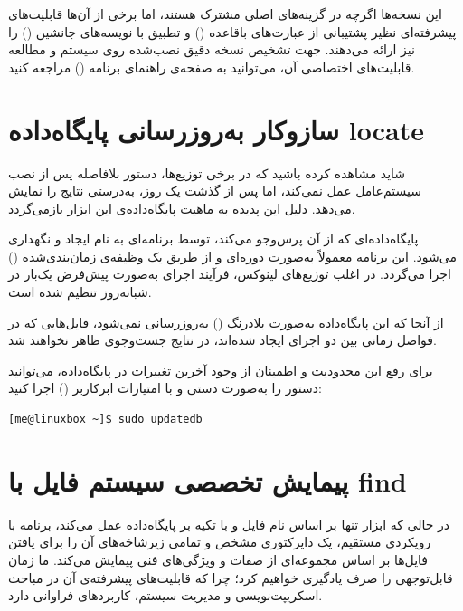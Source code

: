 این نسخه‌ها اگرچه در گزینه‌های اصلی مشترک هستند، اما برخی از آن‌ها قابلیت‌های پیشرفته‌ای نظیر پشتیبانی از عبارت‌های باقاعده () و تطبیق با نویسه‌های جانشین () را نیز ارائه می‌دهند. جهت تشخیص نسخه دقیق نصب‌شده روی سیستم و مطالعه قابلیت‌های اختصاصی آن، می‌توانید به صفحه‌ی راهنمای برنامه () مراجعه کنید.

\section{سازوکار به‌روزرسانی پایگاه‌داده locate}

شاید مشاهده کرده باشید که در برخی توزیع‌ها، دستور  بلافاصله پس از نصب سیستم‌عامل عمل نمی‌کند، اما پس از گذشت یک روز، به‌درستی نتایج را نمایش می‌دهد. دلیل این پدیده به ماهیت پایگاه‌داده‌ی این ابزار بازمی‌گردد.

پایگاه‌داده‌ای که  از آن پرس‌وجو می‌کند، توسط برنامه‌ای به نام  ایجاد و نگهداری می‌شود. این برنامه معمولاً به‌صورت دوره‌ای و از طریق یک وظیفه‌ی زمان‌بندی‌شده () اجرا می‌گردد. در اغلب توزیع‌های لینوکس، فرآیند اجرای  به‌صورت پیش‌فرض یک‌بار در شبانه‌روز تنظیم شده است.

از آنجا که این پایگاه‌داده به‌صورت بلادرنگ () به‌روزرسانی نمی‌شود، فایل‌هایی که در فواصل زمانی بین دو اجرای  ایجاد شده‌اند، در نتایج جست‌وجوی  ظاهر نخواهند شد.

برای رفع این محدودیت و اطمینان از وجود آخرین تغییرات در پایگاه‌داده، می‌توانید دستور  را به‌صورت دستی و با امتیازات ابرکاربر () اجرا کنید:

\begin{latin}
\begin{lstlisting}
[me@linuxbox ~]$ sudo updatedb
\end{lstlisting}
\end{latin}

\section{پیمایش تخصصی سیستم فایل با find}

در حالی که ابزار  تنها بر اساس نام فایل و با تکیه بر پایگاه‌داده عمل می‌کند، برنامه  با رویکردی مستقیم، یک دایرکتوری مشخص و تمامی زیرشاخه‌های آن را برای یافتن فایل‌ها بر اساس مجموعه‌ای از صفات و ویژگی‌های فنی پیمایش می‌کند. ما زمان قابل‌توجهی را صرف یادگیری  خواهیم کرد؛ چرا که قابلیت‌های پیشرفته‌ی آن در مباحث اسکریپت‌نویسی و مدیریت سیستم، کاربردهای فراوانی دارد.

